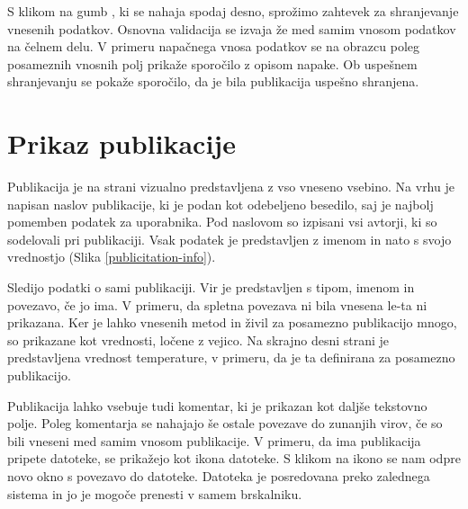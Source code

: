 S klikom na gumb , ki se nahaja spodaj desno, sprožimo zahtevek za shranjevanje vnesenih podatkov. Osnovna validacija se izvaja že med samim vnosom podatkov na čelnem delu. V primeru napačnega vnosa podatkov se na obrazcu poleg posameznih vnosnih polj prikaže sporočilo z opisom napake. Ob uspešnem shranjevanju se pokaže sporočilo, da je bila publikacija uspešno shranjena.


\section{Prikaz publikacije}
Publikacija je na strani vizualno predstavljena z vso vneseno vsebino. Na vrhu je napisan naslov publikacije, ki je podan kot odebeljeno besedilo, saj je najbolj pomemben podatek za uporabnika. Pod naslovom so izpisani vsi avtorji, ki so sodelovali pri publikaciji. Vsak podatek je predstavljen z imenom in nato s svojo vrednostjo (Slika \ref{publicitation-info}).

Sledijo podatki o sami publikaciji. Vir je predstavljen s tipom, imenom in povezavo, če jo ima. V primeru, da spletna povezava ni bila vnesena le-ta ni prikazana. Ker je lahko vnesenih metod in živil za posamezno publikacijo mnogo, so prikazane kot vrednosti, ločene z vejico. Na skrajno desni strani je predstavljena vrednost temperature, v primeru, da je ta definirana za posamezno publikacijo.

Publikacija lahko vsebuje tudi komentar, ki je prikazan kot daljše tekstovno polje. Poleg komentarja se nahajajo še ostale povezave do zunanjih virov, če so bili vneseni med samim vnosom publikacije. V primeru, da ima publikacija pripete datoteke, se prikažejo kot ikona datoteke. S klikom na ikono se nam odpre novo okno s povezavo do datoteke. Datoteka je posredovana preko zalednega sistema in jo je mogoče prenesti v samem brskalniku.


